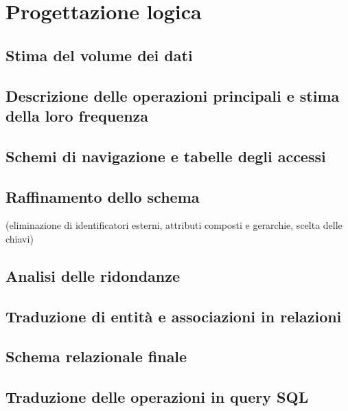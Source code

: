 \section{Progettazione logica}
\subsection{Stima del volume dei dati}

\subsection{Descrizione delle operazioni principali e stima della loro frequenza}

\subsection{Schemi di navigazione e tabelle degli accessi}

\subsection{Raffinamento dello schema}
(eliminazione di identificatori esterni, attributi composti e gerarchie, scelta delle chiavi)

\subsection{Analisi delle ridondanze}

\subsection{Traduzione di entità e associazioni in relazioni}

\subsection{Schema relazionale finale}

\subsection{Traduzione delle operazioni in query SQL}
